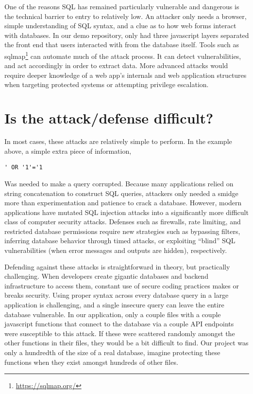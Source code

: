 \documentclass[12pt]{article}
\begin{document}
One of the reasons SQL has remained particularly vulnerable and dangerous is the technical barrier to entry to relatively low. An attacker only needs a browser, simple understanding of SQL syntax, and a clue as to how web forms interact with databases. In our demo repository, only had three javascript layers separated the front end that users interacted with from the database itself. Tools such as sqlmap\footnote{\url{https://sqlmap.org/}} can automate much of the attack process. It can detect vulnerabilities, and act accordingly in order to extract data. More advanced attacks would require deeper knowledge of a web app’s internals and web application structures when targeting protected systems or attempting privilege escalation.

\section{Is the attack/defense difficult?}

In most cases, these attacks are relatively simple to perform. In the example above, a simple extra piece of information,

\begin{lstlisting}
' OR '1'='1
\end{lstlisting}

Was needed to make a query corrupted. Because many applications relied on string concatenation to construct SQL queries, attackers only needed a smidge more than experimentation and patience to crack a database. However, modern applications have mutated SQL injection attacks into a significantly more difficult class of computer security attacks. Defenses such as firewalls, rate limiting, and restricted database permissions require new strategies such as bypassing filters, inferring database behavior through timed attacks, or exploiting “blind” SQL vulnerabilities (when error messages and outputs are hidden), respectively.

Defending against these attacks is straightforward in theory, but practically challenging. When developers create gigantic databases and backend infrastructure to access them, constant use of secure coding practices makes or breaks security. Using proper syntax across every database query in a large application is challenging, and a single insecure query can leave the entire database vulnerable. In our application, only a couple files with a couple javascript functions that connect to the database via a couple API endpoints were susceptible to this attack. If these were scattered randomly amongst the other functions in their files, they would be a bit difficult to find. Our project was only a hundredth of the size of a real database, imagine protecting these functions when they exist amongst hundreds of other files.
\end{document}
